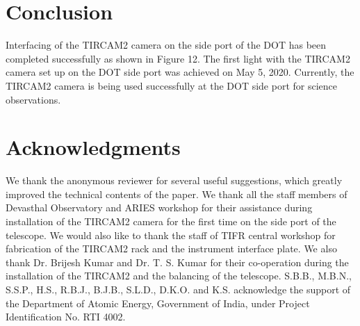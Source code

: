 \documentclass{jaa}
\begin{document}
\section{Conclusion}

Interfacing of the TIRCAM2 camera on the side port of the DOT has been completed successfully as shown in Figure 12. The first light with the TIRCAM2 camera set up on the DOT side port was achieved on May 5, 2020. Currently, the TIRCAM2 camera is being used successfully at the DOT side port for science observations.

\section{Acknowledgments}
We thank the anonymous reviewer for several useful suggestions, which greatly improved the technical contents of the paper.
We thank all the staff members of Devasthal Observatory and ARIES workshop for their assistance during installation of the TIRCAM2 camera for the first time on the side port of the telescope. We would also like to thank the staff of TIFR central workshop for fabrication of the TIRCAM2 rack and the instrument interface plate. We also thank Dr. Brijesh Kumar and Dr. T. S. Kumar for their co-operation during the installation of the TIRCAM2 and the balancing of the telescope. S.B.B., M.B.N., S.S.P., H.S., R.B.J., B.J.B., S.L.D., D.K.O. and K.S. acknowledge the support of the Department of Atomic Energy, Government of India, under Project Identification No. RTI 4002.


\vspace{-2em}
\end{document}
